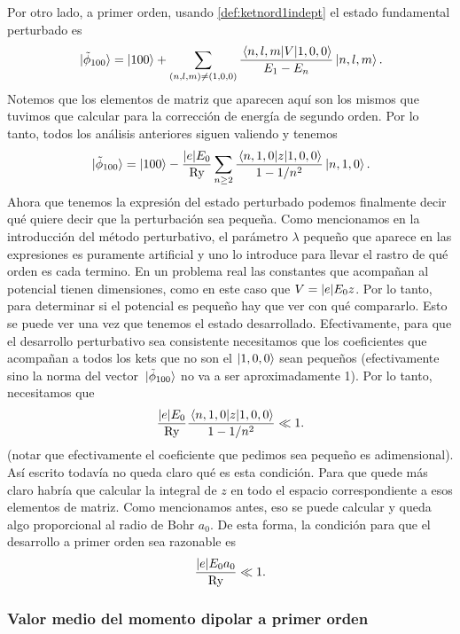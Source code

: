 \documentclass[10pt, a4paper]{article}
\newcommand{\Ry}{\ensuremath{\text{Ry}}}
\numberwithin{equation}{subsection}
\begin{document}
Por otro lado, a primer orden, usando \eqref{def:ketnord1indept} el estado
fundamental perturbado es
\begin{equation}
  \ket*{\tilde{\phi}_{100}} = \ket{100} + 
  \sum_{(n,l,m) \neq (1,0,0)}\frac{\matrixel{n,l,m}{V}{1,0,0}}{E_1 - E_n}
  \ket{n,l,m}.
\end{equation}
Notemos que los elementos de matriz que aparecen aquí son los mismos que
tuvimos que calcular para la corrección de energía de segundo orden. Por lo
tanto, todos los análisis anteriores siguen valiendo y tenemos
\begin{equation} \label{eq:statefund1ordstark}
  \ket*{\tilde{\phi}_{100}} = \ket{100} - \frac{\abs{e}E_0}{\Ry}
    \sum_{n \geq 2} \frac{\matrixel{n,1,0}{z}{1,0,0}}{1 - 1/n^2} \ket{n,1,0}.
\end{equation}
Ahora que tenemos la expresión del estado perturbado podemos finalmente decir
qué quiere decir que la perturbación sea pequeña. Como mencionamos en la
introducción del método perturbativo, el parámetro $\lambda$ pequeño que
aparece en las expresiones es puramente artificial y uno lo introduce para
llevar el rastro de qué orden es cada termino. En un problema real las
constantes que acompañan al potencial tienen dimensiones, como en este caso que
$V = \abs{e}E_0z$. Por lo tanto, para determinar si el potencial es pequeño hay
que ver con qué compararlo. Esto se puede ver una vez que tenemos el estado
desarrollado. Efectivamente, para que el desarrollo perturbativo sea
consistente necesitamos que los coeficientes que acompañan a todos los kets que
no son el $\ket{1,0,0}$ sean pequeños (efectivamente sino la norma del vector
$\ket*{\tilde{\phi}_{100}}$ no va a ser aproximadamente 1). Por lo
tanto, necesitamos que
\begin{equation}
  \frac{\abs{e}E_0}{\Ry}\frac{\matrixel{n,1,0}{z}{1,0,0}}{1 - 1/n^2} \ll 1.
\end{equation}
(notar que efectivamente el coeficiente que pedimos sea pequeño es
adimensional). Así escrito todavía no queda claro qué es esta condición. Para
que quede más claro habría que calcular la integral de $z$ en todo el espacio
correspondiente a esos elementos de matriz. Como mencionamos antes, eso se puede
calcular y queda algo proporcional al radio de Bohr $a_0$. De esta forma, la
condición para que el desarrollo a primer orden sea razonable es
\begin{equation}
  \frac{\abs{e}E_0a_0}{\Ry} \ll 1.
\end{equation}

\subsubsection{Valor medio del momento dipolar a primer orden}
\end{document}
